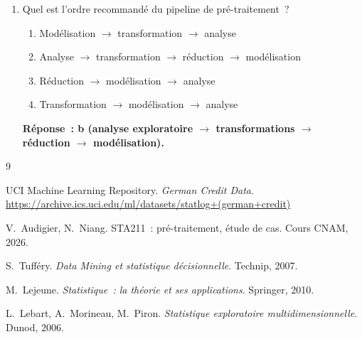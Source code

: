 \documentclass[a4paper,11pt]{article}
\theoremstyle{definition}
\theoremstyle{remark}
\begin{document}
\begin{enumerate}
  \item Quel est l'ordre recommandé du pipeline de pré-traitement~?
    \begin{enumerate}
      \item Modélisation $\rightarrow$ transformation $\rightarrow$ analyse
      \item Analyse $\rightarrow$ transformation $\rightarrow$ réduction
        $\rightarrow$ modélisation
      \item Réduction $\rightarrow$ modélisation $\rightarrow$ analyse
      \item Transformation $\rightarrow$ modélisation $\rightarrow$ analyse
    \end{enumerate}
    \textbf{Réponse~: b (analyse exploratoire $\rightarrow$ transformations
    $\rightarrow$ réduction $\rightarrow$ modélisation).}

\end{enumerate}

\begin{thebibliography}{9}

  UCI Machine Learning Repository.
  \newblock \emph{German Credit Data}.
  \newblock \url{https://archive.ics.uci.edu/ml/datasets/statlog+(german+credit)}

  V.~Audigier, N.~Niang.
  \newblock STA211~: pré-traitement, étude de cas.
  \newblock Cours CNAM, 2026.

  S.~Tufféry.
  \newblock \emph{Data Mining et statistique décisionnelle}.
  \newblock Technip, 2007.

  M.~Lejeune.
  \newblock \emph{Statistique~: la théorie et ses applications}.
  \newblock Springer, 2010.

  L.~Lebart, A.~Morineau, M.~Piron.
  \newblock \emph{Statistique exploratoire multidimensionnelle}.
  \newblock Dunod, 2006.

\end{thebibliography}
\end{document}
